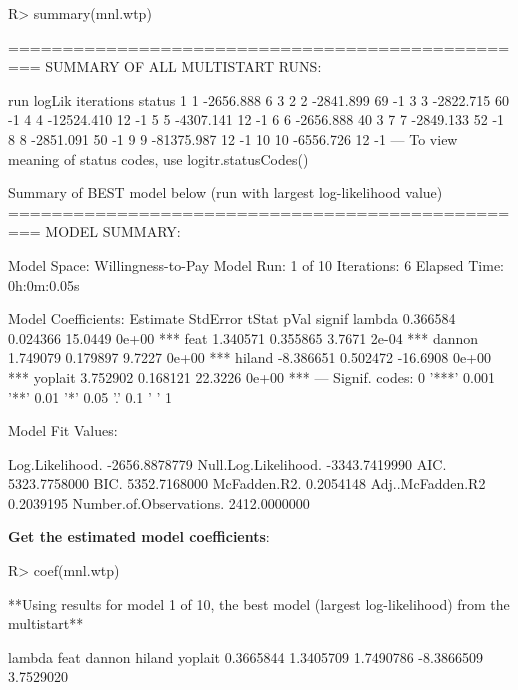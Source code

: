 \documentclass[article]{jss}
\begin{document}
\begin{CodeChunk}

\begin{CodeInput}
R> summary(mnl.wtp)
\end{CodeInput}

\begin{CodeOutput}
=================================================
SUMMARY OF ALL MULTISTART RUNS:

   run     logLik iterations status
1    1  -2656.888          6      3
2    2  -2841.899         69     -1
3    3  -2822.715         60     -1
4    4 -12524.410         12     -1
5    5  -4307.141         12     -1
6    6  -2656.888         40      3
7    7  -2849.133         52     -1
8    8  -2851.091         50     -1
9    9 -81375.987         12     -1
10  10  -6556.726         12     -1
---
To view meaning of status codes, use logitr.statusCodes() 

Summary of BEST model below (run with largest log-likelihood value)
=================================================
MODEL SUMMARY: 
                                
Model Space:  Willingness-to-Pay
Model Run:               1 of 10
Iterations:                    6
Elapsed Time:        0h:0m:0.05s

Model Coefficients: 
         Estimate StdError    tStat  pVal signif
lambda   0.366584 0.024366  15.0449 0e+00    ***
feat     1.340571 0.355865   3.7671 2e-04    ***
dannon   1.749079 0.179897   9.7227 0e+00    ***
hiland  -8.386651 0.502472 -16.6908 0e+00    ***
yoplait  3.752902 0.168121  22.3226 0e+00    ***
---
Signif. codes:  0 '***' 0.001 '**' 0.01 '*' 0.05 '.' 0.1 ' ' 1

Model Fit Values: 
                                     
Log.Likelihood.         -2656.8878779
Null.Log.Likelihood.    -3343.7419990
AIC.                     5323.7758000
BIC.                     5352.7168000
McFadden.R2.                0.2054148
Adj..McFadden.R2            0.2039195
Number.of.Observations.  2412.0000000
\end{CodeOutput}
\end{CodeChunk}

\textbf{Get the estimated model coefficients}:

\begin{CodeChunk}

\begin{CodeInput}
R> coef(mnl.wtp)
\end{CodeInput}

\begin{CodeOutput}
**Using results for model 1 of 10,
the best model (largest log-likelihood) from the multistart**
\end{CodeOutput}

\begin{CodeOutput}
    lambda       feat     dannon     hiland    yoplait 
 0.3665844  1.3405709  1.7490786 -8.3866509  3.7529020 
\end{CodeOutput}
\end{CodeChunk}
\end{document}
